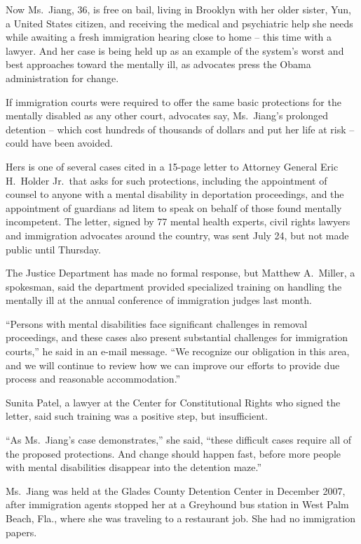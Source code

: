 ﻿\documentclass[12pt]{article}
\begin{document}
Now Ms.~Jiang, 36, is free on bail\cite{bail}, living in Brooklyn with her older sister, Yun, a
United States citizen, and receiving the medical and psychiatric help she needs while awaiting a
fresh immigration hearing close to home -- this time with a lawyer. And her case is being held up as
an example of the system's worst and best approaches toward the mentally ill, as advocates press the
Obama administration for change.

If immigration courts were required to offer the same basic protections for the mentally disabled as
any other court, advocates say, Ms.~Jiang's prolonged detention -- which cost hundreds of thousands
of dollars and put her life at risk -- could have been avoided.

Hers is one of several cases cited in a 15-page letter to Attorney General Eric H.~Holder Jr.~that
asks for such protections, including the appointment of counsel to anyone with a mental disability
in deportation proceedings, and the appointment of guardians ad litem to speak on behalf of those
found mentally incompetent. The letter, signed by 77 mental health experts, civil rights lawyers and
immigration advocates around the country, was sent July 24, but not made public until Thursday.

The Justice Department has made no formal response, but Matthew A.~Miller, a spokesman, said the
department provided specialized training on handling the mentally ill at the annual conference of
immigration judges last month.

``Persons with mental disabilities face significant challenges in removal proceedings, and these
cases also present substantial challenges for immigration courts,'' he said in an e-mail message.
``We recognize our obligation\cite{obligation} in this area, and we will continue to review how we
can improve our efforts to provide due process and reasonable accommodation\cite{accommodation}.''

Sunita Patel, a lawyer at the Center for Constitutional Rights who signed the letter, said such
training was a positive step, but insufficient.

``As Ms.~Jiang's case demonstrates,'' she said, ``these difficult cases require all of the proposed
protections. And change should happen fast, before more people with mental disabilities disappear
into the detention maze.''

Ms.~Jiang was held at the Glades County Detention Center in December 2007, after immigration agents
stopped her at a Greyhound bus station in West Palm Beach, Fla., where she was traveling to a
restaurant job. She had no immigration papers.
\end{document}

